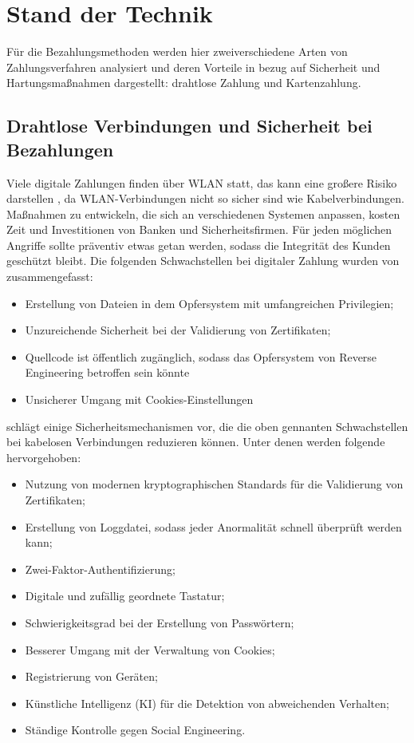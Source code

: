 \section{Stand der Technik}

Für die Bezahlungsmethoden werden hier zweiverschiedene Arten von Zahlungsverfahren analysiert und deren
Vorteile in bezug auf Sicherheit und Hartungsmaßnahmen dargestellt: drahtlose Zahlung und Kartenzahlung.

\subsection{Drahtlose Verbindungen und Sicherheit bei Bezahlungen}

Viele digitale Zahlungen finden über WLAN statt, das kann eine großere Risiko darstellen \cite{refip:NYRS}, 
da WLAN-Verbindungen nicht so sicher sind wie Kabelverbindungen. Maßnahmen zu entwickeln, die sich an 
verschiedenen Systemen anpassen, kosten Zeit und Investitionen von Banken und Sicherheitsfirmen. Für jeden 
möglichen Angriffe sollte präventiv etwas getan werden, sodass die Integrität des Kunden geschützt bleibt. 
Die folgenden Schwachstellen bei digitaler Zahlung wurden von \cite{refip:NYRS} zusammengefasst:

\begin{itemize}
    \item Erstellung von Dateien in dem Opfersystem mit umfangreichen Privilegien;
    \item Unzureichende Sicherheit bei der Validierung von Zertifikaten;
    \item Quellcode ist öffentlich zugänglich, sodass das Opfersystem von Reverse
    Engineering betroffen sein könnte
    \item Unsicherer Umgang mit Cookies-Einstellungen
\end{itemize}

\cite{refip:NYRS} schlägt einige Sicherheitsmechanismen vor, die die oben gennanten Schwachstellen bei 
kabelosen Verbindungen reduzieren können. Unter denen werden folgende hervorgehoben: 

\begin{itemize}
    \item Nutzung von modernen kryptographischen Standards für die Validierung von Zertifikaten;
    \item Erstellung von Loggdatei, sodass jeder Anormalität schnell überprüft werden kann;
    \item Zwei-Faktor-Authentifizierung;
    \item Digitale und zufällig geordnete Tastatur;
    \item Schwierigkeitsgrad bei der Erstellung von Passwörtern;
    \item Besserer Umgang mit der Verwaltung von Cookies;
    \item Registrierung von Geräten;
    \item Künstliche Intelligenz (KI) für die Detektion von abweichenden Verhalten;
    \item Ständige Kontrolle gegen Social Engineering.
\end{itemize}

